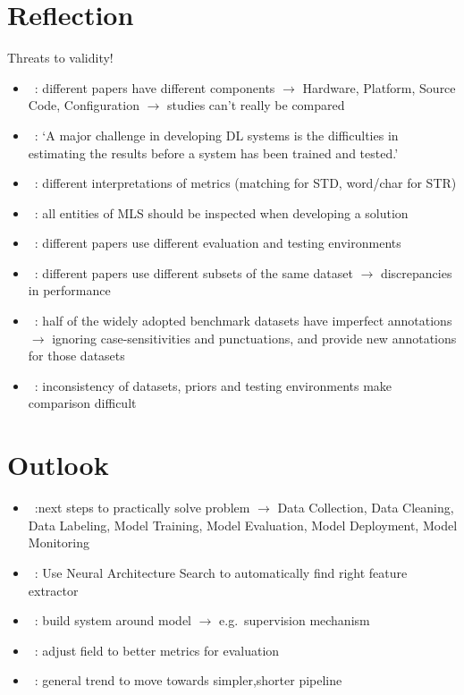 \section{Reflection}
Threats to validity!
\begin{itemize}
    \item~\cite{arpteg_software_2018}: different papers have different components
        $\rightarrow$ Hardware, Platform, Source Code, Configuration
        $\rightarrow$ studies can't really be compared
    \item~\cite{arpteg_software_2018}: `A major challenge in developing DL systems is the
        difficulties in estimating the results before a system has been trained and tested.'
    \item~\cite{long_scene_2021}: different interpretations of metrics (matching for \ac{STD},
        word/char for \ac{STR})
    \item~\cite{siebert_construction_2021,nakamichi_requirements-driven_2020}: all entities of
        \ac{MLS} should be inspected when developing a solution
    \item~\cite{baek_what_2019}: different papers use different evaluation and testing environments
    \item~\cite{baek_what_2019}: different papers use different subsets of the same dataset
        $\rightarrow$ discrepancies in performance
    \item~\cite{long_unrealtext_2020}: half of the widely adopted benchmark datasets have imperfect
        annotations $\rightarrow$ ignoring case-sensitivities and punctuations, and provide new
        annotations for those datasets
    \item~\cite{chen_text_2021}: inconsistency of datasets, priors and testing environments make
        comparison difficult
\end{itemize}

\section{Outlook}

\begin{itemize}
    \item~\cite{watanabe_preliminary_2019}:next steps to practically solve problem
        $\rightarrow$  Data Collection, Data Cleaning, Data Labeling, Model Training,
        Model Evaluation, Model Deployment, Model Monitoring
    \item~\cite{zhao_improving_2020}: Use Neural Architecture Search to automatically find right
        feature extractor
    \item~\cite{siebert_construction_2021,nakamichi_requirements-driven_2020}: build system around
        model $\rightarrow$ e.g.\ supervision mechanism
    \item~\cite{shi_icdar2017_2017,he_icpr2018_2018}: adjust field to better metrics for evaluation
    \item~\cite{long_scene_2021}: general trend to move towards simpler,shorter pipeline
\end{itemize}
